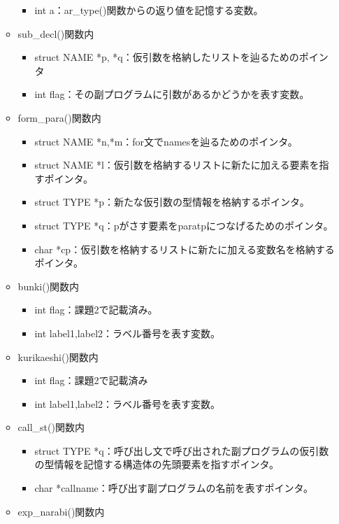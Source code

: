 \documentclass{jarticle}
\begin{document}
\begin{itemize}
\begin{itemize}
\begin{itemize}
      \item int a：ar\_type()関数からの返り値を記憶する変数。
    \end{itemize}
    \item sub\_decl()関数内
    \begin{itemize}
      \item struct NAME *p, *q：仮引数を格納したリストを辿るためのポインタ
      \item int flag：その副プログラムに引数があるかどうかを表す変数。
    \end{itemize}
    \item form\_para()関数内
    \begin{itemize}
      \item struct NAME *n,*m：for文でnamesを辿るためのポインタ。
      \item struct NAME *l：仮引数を格納するリストに新たに加える要素を指すポインタ。
      \item struct TYPE *p：新たな仮引数の型情報を格納するポインタ。
      \item struct TYPE *q：pがさす要素をparatpにつなげるためのポインタ。
      \item char *cp：仮引数を格納するリストに新たに加える変数名を格納するポインタ。
    \end{itemize}
    \item bunki()関数内
    \begin{itemize}
      \item int flag：課題2で記載済み。
      \item int label1,label2：ラベル番号を表す変数。
    \end{itemize}
    \item kurikaeshi()関数内
    \begin{itemize}
      \item
      int
      flag：課題2で記載済み
      \item int label1,label2：ラベル番号を表す変数。
    \end{itemize}
    \item call\_st()関数内
    \begin{itemize}
      \item struct TYPE *q：呼び出し文で呼び出された副プログラムの仮引数の型情報を記憶する構造体の先頭要素を指すポインタ。
      \item char *callname：呼び出す副プログラムの名前を表すポインタ。
    \end{itemize}
    \item exp\_narabi()関数内
    \begin{itemize}

\end{itemize}
\end{itemize}
\end{itemize}
\end{document}
